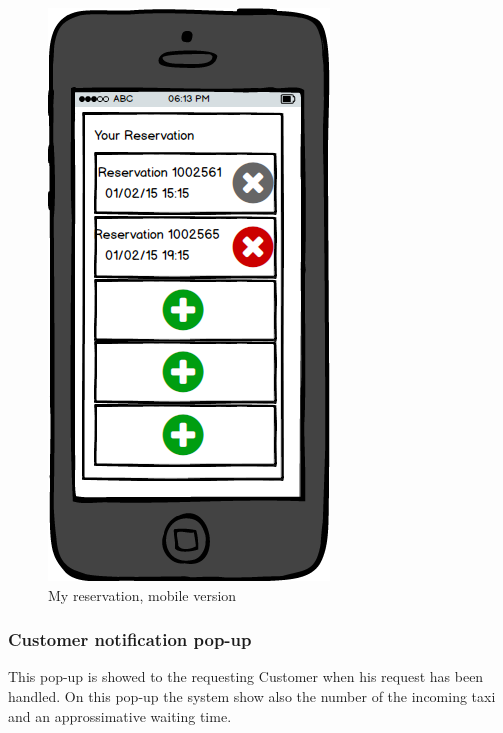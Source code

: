 \documentclass{report}
\begin{document}
				\begin{figure}[H]
					\centering
					\includegraphics[scale=0.4]{IMG/UserInterfaces/myReservation_m.png}
					\caption{My reservation, mobile version}\label{myreservation_m}
				\end{figure}
			
			
			\subsubsection{Customer notification pop-up}
			This pop-up is showed to the requesting Customer when his request has been handled. On this pop-up the system show also the number of the incoming taxi and an approssimative waiting time.
			
\end{document}
